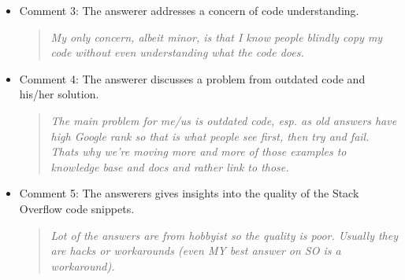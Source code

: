 \documentclass{svjour3}                     %
\begin{document}
\begin{itemize}[label={}]
	\item Comment 3: The answerer addresses a concern of code understanding.
	
	\begin{quote}\textit{My only concern, albeit minor, is that I know people blindly copy my code without even understanding what the code does.}\end{quote}
	
	\item Comment 4: The answerer discusses a problem from outdated code and his/her solution.
	
	\begin{quote}\textit{The main problem for me/us is outdated code, esp. as old answers have high Google rank so that is what people see first, then try and fail. Thats why we're moving more and more of those examples to knowledge base and docs and rather link to those.}\end{quote}
	
	\item Comment 5: The answerers gives insights into the quality of the Stack Overflow code snippets.
	
	\begin{quote}\textit{Lot of the answers are from hobbyist so the quality is poor. Usually they are hacks or workarounds (even MY best answer on SO is a workaround).}\end{quote}
\end{itemize}
\end{document}
